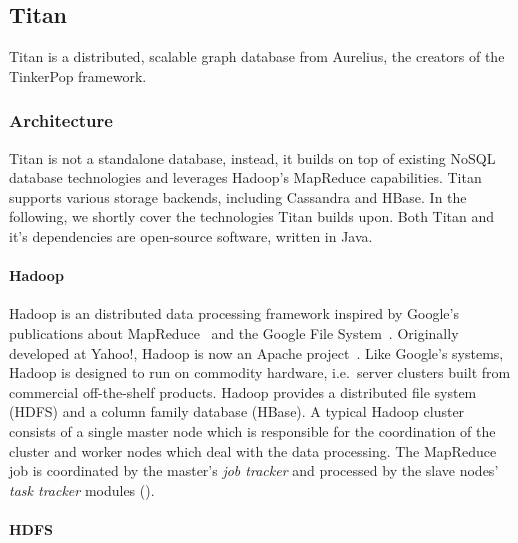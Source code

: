 
\subsection{Titan}
\label{titan}

Titan is a distributed, scalable graph database from Aurelius, the creators of the TinkerPop framework. 

\subsubsection{Architecture}

Titan is not a standalone database, instead, it builds on top of existing NoSQL database technologies and leverages Hadoop's MapReduce capabilities. Titan supports various storage backends, including Cassandra and HBase. In the following, we shortly cover the technologies Titan builds upon. Both Titan and it's dependencies are open-source software, written in Java.

\paragraph{Hadoop}

Hadoop is an distributed data processing framework inspired by Google's publications about MapReduce~\cite{Dean:2008:MSD:1327452.1327492} and the Google File System~\cite{Ghemawat:2003:GFS:945445.945450}. Originally developed at Yahoo!, Hadoop is now an Apache project~\cite{Hadoop}. Like Google's systems, Hadoop is designed to run on commodity hardware, i.e.\ server clusters built from commercial off-the-shelf products. Hadoop provides a distributed file system (HDFS) and a column family database (HBase). %
A typical Hadoop cluster consists of a single master node which is responsible for the coordination of the cluster and worker nodes which deal with the data processing. The MapReduce job is coordinated by the master's \emph{job tracker} and processed by the slave nodes' \emph{task tracker} modules ().


\paragraph{HDFS}

